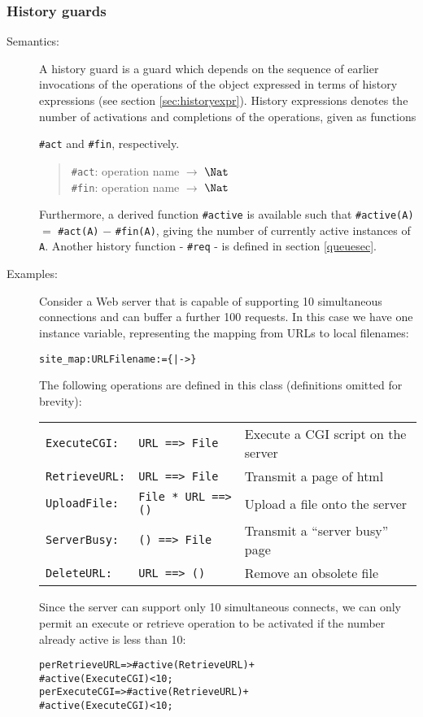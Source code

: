 \documentclass[\pformat,12pt]{article}
\begin{document}
\subsubsection{History guards}
\begin{description}
\item[Semantics:] A history guard is a guard which depends on the
sequence of earlier invocations of the operations of the object
expressed in terms of history expressions (see section
\ref{sec:historyexpr}). History expressions denotes the number
of activations and completions of the operations, given as functions

{\tt \#act} and {\tt \#fin}, respectively. 
\begin{quote}
{\tt \#act}: operation name $\rightarrow$ $\Nat$ \\
{\tt \#fin}: operation name $\rightarrow$ $\Nat$ 
\end{quote}

Furthermore, a derived function {\tt \#active} is available such that
{\tt \#active(}{\tt A}{\tt )} $=$ {\tt \#act(}{\tt A}{\tt )} $-$
{\tt \#fin(}{\tt A}{\tt )}, giving the number of currently active
instances of {\tt A}. Another history function - \texttt{\#req} - is
defined in section \ref{queuesec}.
\item[Examples:]
Consider a Web server\label{example:webserver} that is capable of
supporting 10 simultaneous 
connections and can buffer a further 100 requests. In this case we
have one instance variable, representing the mapping from URLs to
local filenames:
\begin{alltt}
    site_map :  URL  Filename := \{|->\}
\end{alltt}

The following operations are defined in this class (definitions
omitted for brevity):

\begin{tabular}{lll}
\texttt{ExecuteCGI:} & \texttt{URL ==> File} & Execute a CGI script on the server\\
\texttt{RetrieveURL:} & \texttt{URL ==> File} & Transmit a page of html\\
\texttt{UploadFile:} & \texttt{File * URL ==> ()} & Upload a file onto the server\\
\texttt{ServerBusy:} & \texttt{() ==> File} & Transmit a ``server busy'' page\\
\texttt{DeleteURL:} & \texttt{URL ==> ()} & Remove an obsolete file
\end{tabular}

Since the server can support only 10 simultaneous connects, we can
only permit an execute or retrieve operation to be activated if the
number already active is less than 10:
\begin{alltt}
    per RetrieveURL => #active(RetrieveURL) +
                       #active(ExecuteCGI) < 10;
    per ExecuteCGI  => #active(RetrieveURL) +
                       #active(ExecuteCGI) < 10;
\end{alltt}


\end{description}
\end{document}
